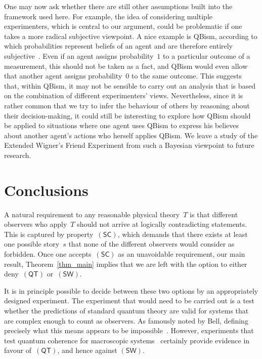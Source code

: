 \documentclass[12pt]{article}
\theoremstyle{plain}
\theoremstyle{definition}
\newcommand*{\QT}{\mathsf{(QT)}}
\newcommand*{\SW}{\mathsf{(SW)}}
\newcommand*{\SelfCons}{\mathsf{(SC)}}
\begin{document}
One may now ask whether there are still other assumptions built into the framework used here. For example, the idea of considering multiple experimenters, which is central to our argument,  could be problematic if one takes a more radical subjective viewpoint. A nice example is QBism, according to which probabilities represent beliefs of an agent and are therefore entirely subjective~\cite{FuMeSc14}. Even if an agent assigns probability~$1$ to a particular outcome of a measurement, this should  not be taken as a fact, and QBism would even allow that another agent assigns probability~$0$ to the same outcome. This suggests that, within QBism, it may not be sensible to carry out an analysis that is based on the combination of different experimenters' views. Nevertheless, since it is rather common that we try to infer the behaviour of others by reasoning about their decision-making, it could still be interesting to explore  how QBism should be applied to situations where one agent uses QBism to express his believes about another agent's actions who herself applies QBism.  We leave a study of the  Extended Wigner's Friend Experiment from such a  Bayesian viewpoint to future research. 

\section{Conclusions} \label{sec_conclusions}

A natural requirement to any reasonable physical theory~$T$ is that different observers who apply~$T$ should not arrive at logically contradicting statements.  This is captured by property~$\SelfCons$, which demands that there exists at least one possible story~$s$ that none of the different observers would consider as forbidden.  Once one accepts~$\SelfCons$  as an unavoidable requirement, our main result, Theorem~\ref{thm_main} implies that we are left with the option to either deny~$\QT$ or~$\SW$. 

It is in principle possible to decide between these two options by an appropriately designed experiment. The experiment that would need to be carried out is a test whether the predictions of standard quantum theory are valid for systems that are complex enough to count as observers. As famously noted by Bell, defining precisely what this means appears to be impossible~\cite{Bell90}. However, experiments that test quantum coherence for macroscopic systems~\cite{ArnHor14} certainly provide evidence in favour of~$\QT$, and hence against $\SW$.
\end{document}
